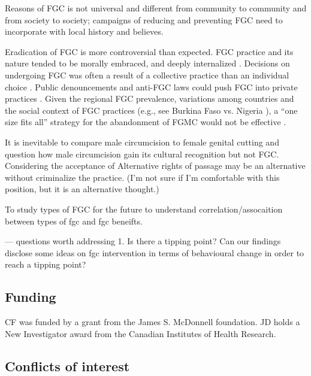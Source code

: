 \documentclass[12pt,]{article}
\begin{document}
Reasons of FGC is not universal and different from community to community and from society to society; campaigns of reducing and preventing FGC need to incorporate with local history and believes.

Eradication of FGC is more controversial than expected.  FGC practice and its nature tended to be morally embraced, and deeply internalized \cite{SchuLien13}.  Decisions on undergoing FGC was often a result of a collective practice than an individual choice \cite{Dell04, Hayf06, FreyJoh07, KandMwek09, Mack96, Mack06, ShelHern06, ShelWand11, YirgKass12}. Public denouncements and anti-FGC laws could push FGC into private practices \cite{GaluKama15, VanCoen17}.  Given the regional FGC prevalence, variations among countries and the social context of FGC practices (e.g., see Burkina Faso \cite{KarmKand11} vs. Nigeria \cite{KandNwak09}), a “one size fits all” strategy for the abandonment of FGMC would not be effective \cite{JohaDiop13, YodeWang13}.

It is inevitable to compare male circumcision to female genital cutting and question how male circumcision gain its cultural recognition but not FGC.  Considering the acceptance of Alternative rights of passage \cite{GaluKama15} may be an alternative without criminalize the practice. (I'm not sure if I'm comfortable with this position, but it is an alternative thought.)

To study types of FGC for the future to understand correlation/assocaition between types of fgc and fgc beneifts.

--- questions worth addressing
1. Is there a tipping point?  Can our findings disclose some ideas on fgc intervention in terms of behavioural change in order to reach a tipping point?
\subsection{Funding}\label{Funding}

CF was funded by a grant from the James S. McDonnell foundation. JD holds a New Investigator award from the Canadian Institutes of Health Research.

\subsection{Conflicts of interest}\label{Conflicts-of-Interest}
\end{document}
